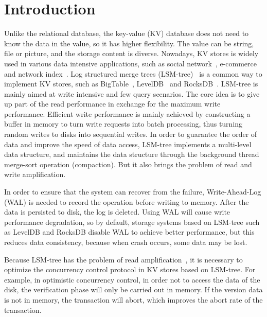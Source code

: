 \section{Introduction}

Unlike the relational database, the key-value (KV) database does not need to know the data in the value, so it has higher flexibility. The value can be string, file or picture, and the storage content is diverse. Nowadays, KV stores is widely used in various data intensive applications, such as social network~\cite{RocksDB}, e-commerce~\cite{Dynamo} and network index~\cite{Bigtable}. Log structured merge trees (LSM-tree)~\cite{LSM-tree} is a common way to implement KV stores, such as BigTable~\cite{Bigtable}, LevelDB~\cite{LevelDB} and RocksDB~\cite{RocksDB}. LSM-tree is mainly aimed at write intensive and few query scenarios. The core idea is to give up part of the read performance in exchange for the maximum write performance. Efficient write performance is mainly achieved by constructing a buffer in memory to turn write requests into batch processing, thus turning random writes to disks into sequential writes. In order to guarantee the order of data and improve the speed of data access, LSM-tree implements a multi-level data structure, and maintains the data structure through the background thread merge-sort operation (compaction). But it also brings the problem of read and write amplification.

In order to ensure that the system can recover from the failure, Write-Ahead-Log (WAL) is needed to record the operation before writing to memory. After the data is persisted to disk, the log is deleted. Using WAL will cause write performance degradation, so by default, storage systems based on LSM-tree such as LevelDB and RocksDB disable WAL to achieve better performance, but this reduces data consistency, because when crash occurs, some data may be lost.

Because LSM-tree has the problem of read amplification~\cite{WiscKey,NVMKV,PebblesDB}, it is necessary to optimize the concurrency control protocol in KV stores based on LSM-tree. For example, in optimistic concurrency control, in order not to access the data of the disk, the verification phase will only be carried out in memory. If the version data is not in memory, the transaction will abort, which improves the abort rate of the transaction.

